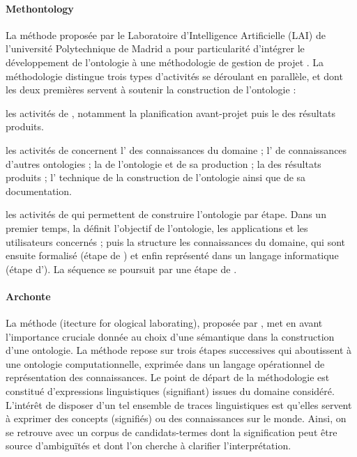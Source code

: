 \paragraph{Methontology}
La méthode proposée par le Laboratoire d'Intelligence Artificielle (LAI) de l'université Polytechnique de Madrid a pour particularité d'intégrer le développement de l'ontologie à une méthodologie de gestion de projet . La méthodologie distingue trois types d'activités se déroulant en parallèle, et dont les deux premières servent à soutenir la construction de l'ontologie :
\begin{liste}
	\item les activités de , notamment la planification avant-projet puis le  des résultats produits. 
	
	\item les activités de  concernent l' des connaissances du domaine ; l' de connaissances d'autres ontologies ; la  de l'ontologie et de sa production ; la  des résultats produits ; l' technique de la construction de l'ontologie ainsi que de sa documentation. 

	\item les activités de  qui permettent de construire l'ontologie par étape. 
	Dans un premier temps, la  définit l'objectif de l'ontologie, les applications et les utilisateurs concernés ; puis la  structure les connaissances du domaine, qui sont ensuite formalisé (étape de ) et enfin représenté dans un langage informatique (étape d'). La séquence se poursuit par une étape de .
\end{liste}



\paragraph{Archonte}
La méthode  (itecture for ological laborating), proposée par \cite{Bachimont2000a}, met en avant l'importance cruciale donnée au choix d'une sémantique dans la construction d'une ontologie.
La méthode repose sur trois étapes successives qui aboutissent à une ontologie computationnelle, exprimée dans un langage opérationnel de représentation des connaissances.
Le point de départ de la méthodologie est constitué d'expressions linguistiques (signifiant) issues du domaine considéré.
L'intérêt de disposer d'un tel ensemble de traces linguistiques est qu'elles servent à exprimer des concepts (signifiés) ou des connaissances sur le monde. 
Ainsi, on se retrouve avec un corpus de candidats-termes dont la signification peut être source d'ambiguïtés et dont l'on cherche à clarifier l'interprétation.\\

